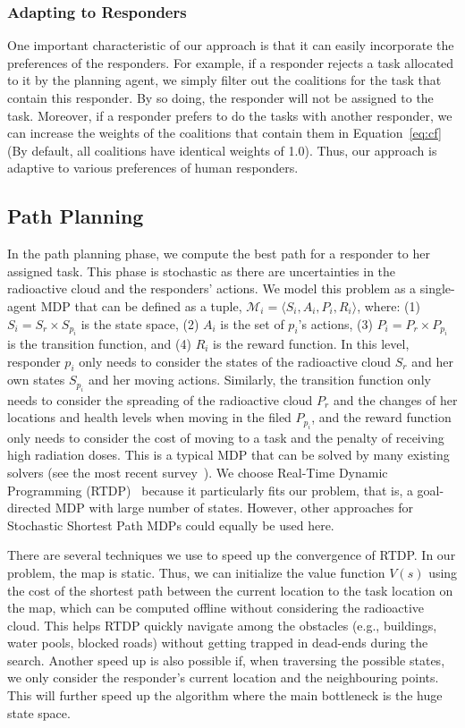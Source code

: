 \subsubsection{Adapting to Responders}\label{sec:adaptive}
One important characteristic of our approach is that it can easily
incorporate the preferences of the responders. For example, if a
responder rejects a task allocated to it by the planning agent, we
simply filter out the coalitions for the task that contain this
responder. By so doing, the responder will not be assigned to the
task. Moreover, if a responder prefers to do the tasks with another
responder, we can increase the weights of the coalitions that
contain them in Equation~\ref{eq:cf} (By default, all coalitions
have identical weights of 1.0). Thus, our approach is adaptive to
various preferences of human responders.

\subsection{Path Planning}
\label{sec:pathplanning}

\noindent In the path planning phase, we compute the best path for
a responder to her assigned task. This phase is stochastic as there
are uncertainties in the radioactive cloud and the responders'
actions. We model this problem as a single-agent MDP that can be
defined as a tuple, $\mathcal{M}_i = \langle S_i, A_i, P_i, R_i
\rangle$, where: (1) $S_i = S_r \times S_{p_i}$ is the state space,
(2) $A_i$ is the set of $p_i$'s actions, (3) $P_i = P_r \times
P_{p_i}$ is the transition function, and (4) $R_i$ is the reward
function. In this level, responder $p_i$ only needs to consider the
states of the radioactive cloud $S_r$ and her own states $S_{p_i}$
and her moving actions. Similarly, the transition function only
needs to consider the spreading of the radioactive cloud $P_r$ and
the changes of her locations and health levels when moving in the
filed $P_{p_i}$, and the reward function only needs to consider the
cost of moving to a task and the penalty of receiving high
radiation doses. This is a typical MDP that can be solved by many
existing solvers (see the most recent
survey~\cite{kolobov2012planning}). We choose Real-Time Dynamic
Programming (RTDP)~\cite{barto1995learning} because it particularly
fits  our problem, that is, a goal-directed MDP with large number
of states. However, other approaches for Stochastic Shortest Path
MDPs could equally be used here.

There are several techniques we use to speed up the convergence of
RTDP. In our problem, the map is static. Thus, we can initialize
the value function $V(s)$ using the cost of the shortest path
between the current location to the task location on the map, which
can be computed offline without considering the radioactive cloud.
This helps RTDP quickly navigate among the obstacles (e.g.,
buildings, water pools, blocked roads) without getting trapped in
dead-ends during the search. Another speed up is also possible if,
when traversing the possible states, we only consider the
responder's current location and the neighbouring points. This will
further speed up the algorithm where the main bottleneck is the
huge state space.

